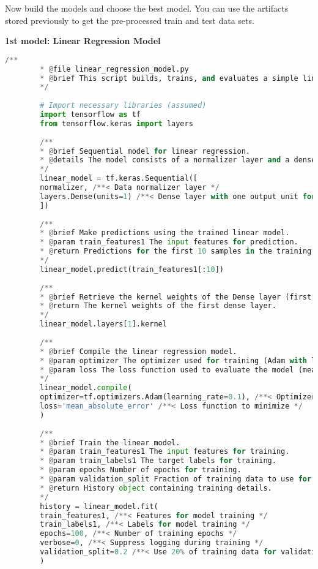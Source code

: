 	\pagebreak
	Now build the models and choose the best model. You can use the artifacts stored previously to get the pre-processed train and test data sets.
	
	\textbf{1st model: Linear Regression Model}
	
	\begin{lstlisting}[language=Python]
		/**
		* @file linear_regression_model.py
		* @brief This script builds, trains, and evaluates a simple linear regression model using TensorFlow.
		*/
		
		# Import necessary libraries (assumed)
		import tensorflow as tf
		from tensorflow.keras import layers
		
		/**
		* @brief Sequential model for linear regression.
		* @details The model consists of a normalizer layer and a dense layer with one unit (output).
		*/
		linear_model = tf.keras.Sequential([
		normalizer, /**< Data normalizer layer */
		layers.Dense(units=1) /**< Dense layer with one output unit for regression */
		])
		
		/**
		* @brief Make predictions using the trained linear model.
		* @param train_features1 The input features for prediction.
		* @return Predictions for the first 10 samples in the training dataset.
		*/
		linear_model.predict(train_features1[:10])
		
		/**
		* @brief Retrieve the kernel weights of the Dense layer (first layer in the model).
		* @return The kernel weights of the first dense layer.
		*/
		linear_model.layers[1].kernel
		
		/**
		* @brief Compile the linear regression model.
		* @param optimizer The optimizer used for training (Adam with learning rate 0.1).
		* @param loss The loss function used to evaluate the model (mean absolute error).
		*/
		linear_model.compile(
		optimizer=tf.optimizers.Adam(learning_rate=0.1), /**< Optimizer with learning rate 0.1 */
		loss='mean_absolute_error' /**< Loss function to minimize */
		)
		
		/**
		* @brief Train the linear model.
		* @param train_features1 The input features for training.
		* @param train_labels1 The target labels for training.
		* @param epochs Number of epochs for training.
		* @param validation_split Fraction of training data to use for validation.
		* @return History object containing training details.
		*/
		history = linear_model.fit(
		train_features1, /**< Features for model training */
		train_labels1, /**< Labels for model training */
		epochs=100, /**< Number of training epochs */
		verbose=0, /**< Suppress logging during training */
		validation_split=0.2 /**< Use 20% of training data for validation */
		)
		

\end{lstlisting}
